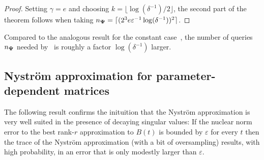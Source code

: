 \begin{proof}

    Setting $\gamma = e$ and choosing $k = \lfloor \log(\delta^{-1}) / 2 \rfloor$,
    the second part of the theorem follows when taking $n_{\boldsymbol{\Psi}} = \lceil (2^3 e \varepsilon^{-1} \log(\delta^{-1}))^2 \rceil$.
\end{proof}

Compared to the analogous result for the constant case~\cite[Lemma 2.1]{meyer-2021-hutch-optimal}, the number of queries $n_{\boldsymbol{\Psi}}$ needed by~ is roughly a factor $\log(\delta^{-1})$ larger.

\subsection{Nyström approximation for parameter-dependent matrices}
\label{subsec:nystrom}

The following result confirms the inituition that the Nystr\"om approximation is very well suited in the presence of decaying singular values: If the nuclear norm error to the best rank-$r$ approximation to $B(t)$ is bounded by $\varepsilon$ for every $t$ then the trace of the Nystr\"om approximation (with a bit of oversampling) results, with high probability, in an error that is only modestly larger than $\varepsilon$.

